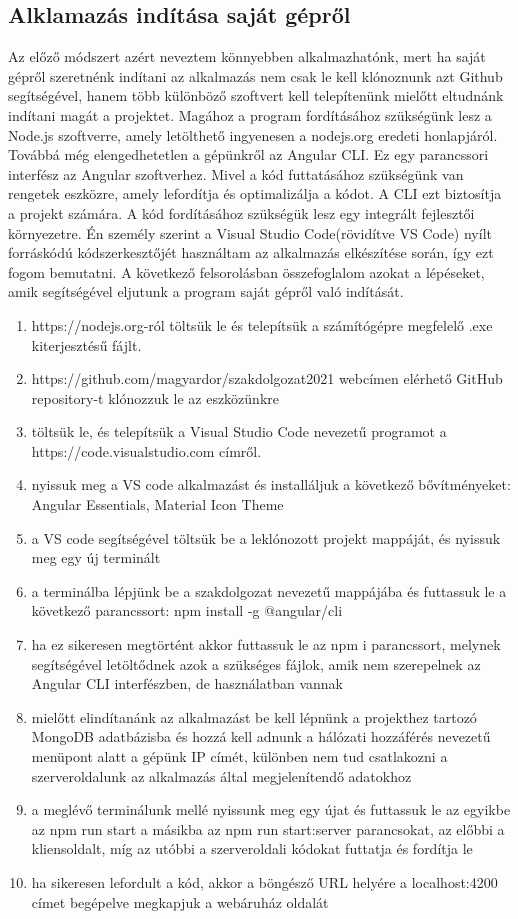 \subsection{Alklamazás indítása saját gépről}
Az előző  módszert azért neveztem könnyebben alkalmazhatónk, mert ha saját gépről szeretnénk indítani az alkalmazás nem csak le kell klónoznunk azt Github segítségével, hanem több különböző szoftvert kell telepítenünk mielőtt eltudnánk indítani magát a projektet. Magához a program fordításához szükségünk lesz a Node.js szoftverre, amely letölthető ingyenesen a nodejs.org eredeti honlapjáról. Továbbá még elengedhetetlen a gépünkről az Angular CLI. Ez egy parancssori interfész az Angular szoftverhez. Mivel a kód futtatásához szükségünk van rengetek eszközre, amely lefordítja és optimalizálja a kódot. A CLI ezt biztosítja a projekt számára. A kód fordításához szükségük lesz egy integrált fejlesztői környezetre. Én személy szerint a Visual Studio Code(rövidítve VS Code) nyílt forráskódú kódszerkesztőjét használtam az alkalmazás elkészítése során, így ezt fogom bemutatni. A következő felsorolásban összefoglalom azokat a lépéseket, amik segítségével eljutunk a program saját gépről való indítását. 

\begin{enumerate}
	\item\label{step:first} https://nodejs.org-ról töltsük le és telepítsük a számítógépre megfelelő .exe kiterjesztésű fájlt.
	\item https://github.com/magyardor/szakdolgozat2021 webcímen elérhető GitHub repository-t klónozzuk le az eszközünkre
	\item töltsük le, és telepítsük a Visual Studio Code nevezetű programot a https://code.visualstudio.com címről.
	\item nyissuk meg a VS code alkalmazást és installáljuk a következő bővítményeket: Angular Essentials, Material Icon Theme
	\item a VS code segítségével töltsük be a leklónozott projekt mappáját, és nyissuk meg egy új terminált
	\item a terminálba lépjünk be a szakdolgozat nevezetű mappájába és futtassuk le a következő parancssort: npm install -g @angular/cli
	\item ha ez sikeresen megtörtént akkor futtassuk le az npm i parancssort, melynek segítségével letöltődnek azok a szükséges fájlok, amik nem szerepelnek az Angular CLI interfészben, de használatban vannak 
	\item mielőtt elindítanánk az alkalmazást be kell lépnünk a projekthez tartozó MongoDB adatbázisba és hozzá kell adnunk a hálózati hozzáférés nevezetű menüpont alatt a gépünk IP címét, különben nem tud csatlakozni a szerveroldalunk az alkalmazás által megjelenítendő adatokhoz
	\item a meglévő terminálunk mellé nyissunk meg egy újat és futtassuk le az egyikbe az npm run start a másikba az npm run start:server parancsokat, az előbbi a kliensoldalt, míg az utóbbi a szerveroldali kódokat futtatja és fordítja le
	\item ha sikeresen lefordult a kód, akkor a böngésző URL helyére a localhost:4200 címet begépelve megkapjuk a webáruház oldalát
\end{enumerate}


